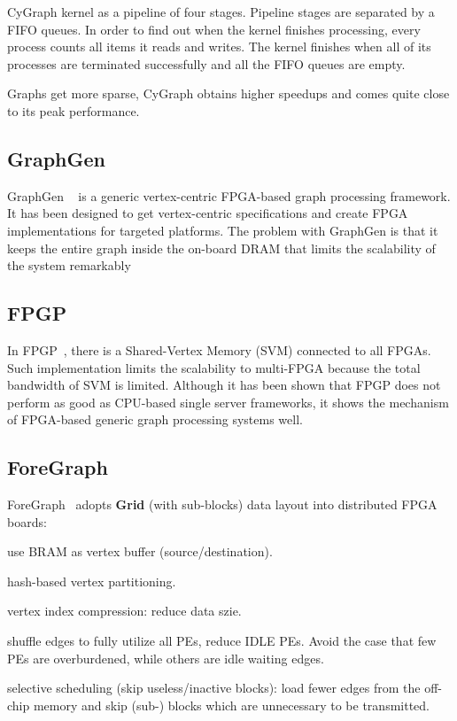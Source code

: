 \documentclass[UTF8,12pt,a4paper]{article}
\begin{document}
CyGraph kernel as a pipeline of four stages.
Pipeline stages are separated by a FIFO queues.
In order to find out when the kernel finishes processing,
every process counts all items it reads and writes.
The kernel finishes when all of its processes
are terminated successfully and all the FIFO queues are empty.

Graphs get more sparse, CyGraph obtains higher speedups
and comes quite close to its peak performance.

\subsection{GraphGen}
GraphGen ~\cite{DBLP:conf/fccm/NurvitadhiWWHNH14}
is a generic vertex-centric FPGA-based graph processing framework.
It has been designed to get vertex-centric specifications
and create FPGA implementations for targeted platforms.
The problem with GraphGen is that it keeps the entire graph
inside the on-board DRAM that limits the scalability of the system remarkably

\subsection{FPGP}
In FPGP~\cite{DBLP:conf/fpga/DaiCWY16},
there is a Shared-Vertex Memory (SVM) connected to all FPGAs.
Such implementation limits the scalability to multi-FPGA
because the total bandwidth of SVM is limited.
Although it has been shown that FPGP
does not perform as good as CPU-based single server frameworks,
it shows the mechanism of FPGA-based generic graph processing systems well.

\subsection{ForeGraph}
ForeGraph~\cite{DBLP:conf/fpga/DaiHCXWY17}
adopts \textbf{Grid} (with sub-blocks)
data layout into distributed FPGA boards:
\begin{compactitem}
  \item use BRAM as vertex buffer (source/destination).
  \item hash-based vertex partitioning.
  \item vertex index compression: reduce data szie.
  \item shuffle edges to fully utilize all PEs, reduce IDLE PEs.
  Avoid the case that few PEs are overburdened,
  while others are idle waiting edges.
  \item selective scheduling (skip useless/inactive blocks):
  load fewer edges from the off-chip memory and
  skip (sub-) blocks which are unnecessary to be transmitted.
\end{compactitem}
\end{document}
